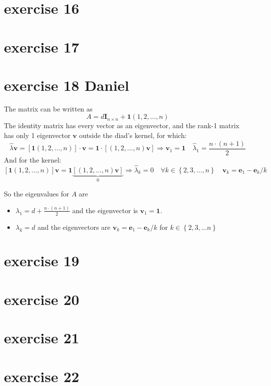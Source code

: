 \documentclass{article}
\begin{document}
\section{exercise 16}
\section{exercise 17}
\section{exercise 18 Daniel}
The matrix can be written as
\[A= d{{\mathbf{I}}_{n \times n}} + {\mathbf{1}} \left( {1,2, \ldots ,n} \right)\]
The identity matrix has every vector as an eigenvector, and the rank-1 matrix has only 1 eigenvector $\mathbf{v}$ outside the diad's kernel, for which:
\[
    \hat\lambda \mathbf{v} = \left[{\mathbf{1}} \left( {1,2, \ldots ,n} \right) \right] \cdot \mathbf{v} = {\mathbf{1}} \cdot \left[ \left( {1,2, \ldots ,n} \right) \mathbf{v}\right] \Rightarrow \mathbf{v}_1 = \mathbf{1} \quad \hat\lambda_1 = \frac{n \cdot (n+1)}{2}
\]
And for the kernel:
\[\left[ {{\mathbf{1}}\left( {1,2, \ldots ,n} \right)} \right]{\mathbf{v}} = {\mathbf{1}}\underbrace {\left[ {\left( {1,2, \ldots ,n} \right){\mathbf{v}}} \right]}_0 \Rightarrow \hat\lambda _k = 0\quad \forall k \in \left\{ {2,3, \ldots ,n} \right\}\quad {{\mathbf{v}}_k} = {{\mathbf{e}}_1} - {{\mathbf{e}}_k}/k\]

So the eigenvalues for $A$ are
\begin{itemize}
    \item $\lambda_1 = d + \frac{n \cdot (n+1)}{2}$ and the eigenvector is $\mathbf{v}_1 = \mathbf{1}$.
    \item $\lambda_k = d$ and the eigenvectors are $\mathbf{v}_k = {\mathbf{e}}_1 - {{\mathbf{e}}_k}/k$ for $k \in \left\{2, 3, \ldots n\right\}$
\end{itemize}


\section{exercise 19}
\section{exercise 20}
\section{exercise 21}

\section{exercise 22}
\end{document}
